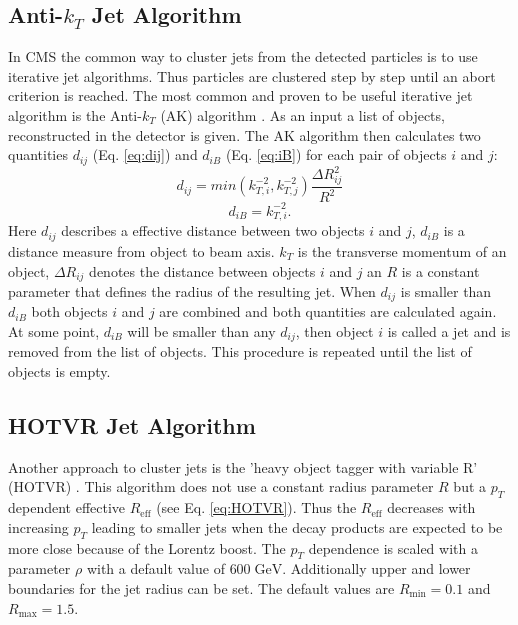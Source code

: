 \subsection{Anti-$k_T$ Jet Algorithm}
	In CMS the common way to cluster jets from the detected particles is to use iterative jet algorithms. Thus particles are clustered step by step until an abort criterion is reached. The most common and proven to be useful iterative jet algorithm is the Anti-$k_T$ (AK) algorithm \cite{antikt}. As an input a list of objects, reconstructed in the detector is given. The AK algorithm then calculates two quantities $d_{ij}$ (Eq. \ref{eq:dij}) and $d_{iB}$ (Eq. \ref{eq:iB}) for each pair of objects $i$ and $j$:
	\begin{equation}
	d_{ij} = min (k_{T,i}^{-2}, k_{T,j}^{-2})  \frac{\Delta R_{ij}^2}{R^2}
	\label{eq:dij}
	\end{equation}
	\begin{equation}
	d_{iB} = k_{T,i}^{-2}.
	\label{eq:iB}
	\end{equation}
	Here $d_{ij}$ describes a effective distance between two objects $i$ and $j$, $d_{iB}$ is a distance measure from object to beam axis. $k_T$ is the transverse momentum of an object, $\Delta R_{ij}$ denotes the distance between objects $i$ and $j$ an $R$ is a constant parameter that defines the radius of the resulting jet. When $d_{ij}$ is smaller than $d_{iB}$ both objects $i$ and $j$ are combined and both quantities are calculated again. At some point, $d_{iB}$ will be smaller than any $d_{ij}$, then object $i$ is called a jet and is removed from the list of objects. This procedure is repeated until the list of objects is empty.
	

\subsection{HOTVR Jet Algorithm}
	Another approach to cluster jets is the 'heavy object tagger with variable R' (HOTVR) \cite{hotvr}. This algorithm does not use a constant radius parameter $R$ but a $p_T$ dependent effective $R_\text{eff}$ (see Eq. \ref{eq:HOTVR}). Thus the $R_\text{eff}$ decreases with increasing $p_T$ leading to smaller jets when the decay products are expected to be more close because of the Lorentz boost. The $p_T$ dependence is scaled with a parameter $\rho$ with a default value of $600\;\text{GeV}$. Additionally upper and lower boundaries for the jet radius can be set. The default values are $R_\text{min} = 0.1$ and $R_\text{max} = 1.5$.
	

